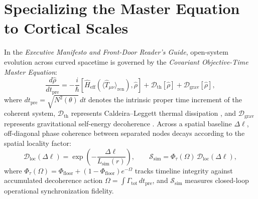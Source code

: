 \documentclass[11pt,a4paper]{article}
\begin{document}
\section{Specializing the Master Equation to Cortical Scales}
In the \emph{Executive Manifesto and Front-Door Reader's Guide}, open-system evolution across curved spacetime is governed by the \emph{Covariant Objective-Time Master Equation}:
\begin{equation}
    \frac{d\hat{\rho}}{dt_{\mathrm{pre}}} = -\frac{i}{\hbar}\left[\hat{H}_{\mathrm{eff}}\left(\langle \hat{T}_{\mu\nu}\rangle_{\mathrm{ren}}\right), \hat{\rho}\right] + \mathcal{D}_{\mathrm{th}}[\hat{\rho}] + \mathcal{D}_{\mathrm{grav}}[\hat{\rho}],
    \label{eq:master}
\end{equation}
where $dt_{\mathrm{pre}} = \sqrt{N^2(\theta)}\,dt$ denotes the intrinsic proper time increment of the coherent system, $\mathcal{D}_{\mathrm{th}}$ represents Caldeira--Leggett thermal dissipation \cite{caldeira1983}, and $\mathcal{D}_{\mathrm{grav}}$ represents gravitational self-energy decoherence \cite{penrose1996,diosi1989}. Across a spatial baseline $\Delta\ell$, off-diagonal phase coherence between separated nodes decays according to the spatial locality factor:
\begin{equation}
    \mathcal{D}_{\mathrm{loc}}(\Delta\ell) = \exp\!\left(-\frac{\Delta\ell}{L_{\mathrm{sim}}(r)}\right), \qquad \mathcal{S}_{\mathrm{sim}} = \Phi_\tau(\Omega)\,\mathcal{D}_{\mathrm{loc}}(\Delta\ell),
    \label{eq:dloc}
\end{equation}
where $\Phi_\tau(\Omega) = \Phi_{\mathrm{floor}} + (1 - \Phi_{\mathrm{floor}})e^{-\Omega}$ tracks timeline integrity against accumulated decoherence action $\Omega = \int \Gamma_{\mathrm{tot}}\,dt_{\mathrm{pre}}$, and $\mathcal{S}_{\mathrm{sim}}$ measures closed-loop operational synchronization fidelity.
\end{document}
